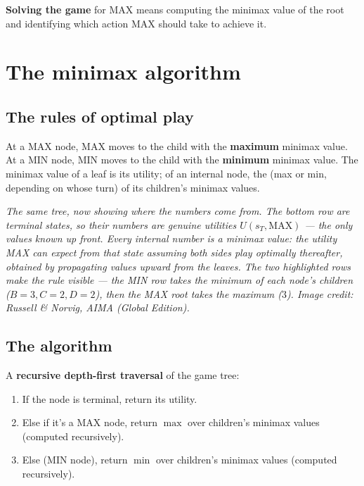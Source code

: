 \documentclass[11pt, a4paper]{article}
\begin{document}
\textbf{Solving the game} for MAX means computing the minimax value of the root and identifying which action MAX should take to achieve it.

\section{The minimax algorithm}

\subsection{The rules of optimal play}

\begin{defbox}
At a MAX node, MAX moves to the child with the \textbf{maximum} minimax value. At a MIN node, MIN moves to the child with the \textbf{minimum} minimax value. The minimax value of a leaf is its utility; of an internal node, the (max or min, depending on whose turn) of its children's minimax values.
\end{defbox}

\begin{center}

\footnotesize\textit{The same tree, now showing where the numbers come from. The bottom row are terminal states, so their numbers are genuine utilities $U(s_T,\mathrm{MAX})$ --- the only values known up front. Every internal number is a \emph{minimax value}: the utility MAX can expect from that state \emph{assuming both sides play optimally thereafter}, obtained by propagating values upward from the leaves. The two highlighted rows make the rule visible --- the MIN row takes the minimum of each node's children ($B=3, C=2, D=2$), then the MAX root takes the maximum ($3$). Image credit: Russell \& Norvig, AIMA (Global Edition).}
\end{center}

\subsection{The algorithm}

\begin{defbox}
A \textbf{recursive depth-first traversal} of the game tree:
\begin{enumerate}
  \item If the node is terminal, return its utility.
  \item Else if it's a MAX node, return $\max$ over children's minimax values (computed recursively).
  \item Else (MIN node), return $\min$ over children's minimax values (computed recursively).
\end{enumerate}
\end{defbox}
\end{document}

